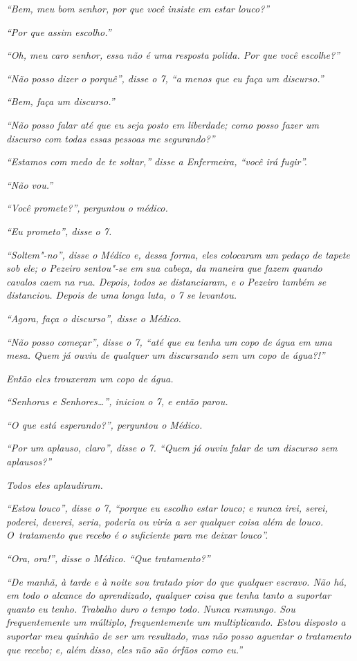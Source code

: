 \emph{``Bem, meu bom senhor, por que você insiste em estar louco?''}

\emph{``Por que assim escolho.''}

\emph{``Oh, meu caro senhor, essa não é uma resposta polida. Por que
você escolhe?''}

\emph{``Não posso dizer o porquê'', disse o 7, ``a menos que eu faça um
discurso.''}

\emph{``Bem, faça um discurso.''}

\emph{``Não posso falar até que eu seja posto em liberdade; como posso
fazer um discurso com todas essas pessoas me segurando?''}

\emph{``Estamos com medo de te soltar,'' disse a Enfermeira, ``você irá
fugir''.}

\emph{``Não vou.''}

\emph{``Você promete?'', perguntou o médico.}

\emph{``Eu prometo'', disse o 7.}

\emph{``Soltem"-no'', disse o Médico e, dessa forma, eles colocaram um
pedaço de tapete sob ele; o Pezeiro sentou"-se em sua cabeça, da maneira
que fazem quando cavalos caem na rua. Depois, todos se distanciaram, e o
Pezeiro também se distanciou. Depois de uma longa luta, o 7 se
levantou.}

\emph{``Agora, faça o discurso'', disse o Médico.}

\emph{``Não posso começar'', disse o 7, ``até que eu tenha um copo de
água em uma mesa. Quem já ouviu de qualquer um discursando sem um copo
de água?!''}

\emph{Então eles trouxeram um copo de água.}

\emph{``Senhoras e Senhores…'', iniciou o 7, e então parou.}

\emph{``O que está esperando?'', perguntou o Médico.}

\emph{``Por um aplauso, claro'', disse o 7. ``Quem já ouviu falar de um
discurso sem aplausos?''}

\emph{Todos eles aplaudiram.}

\emph{``Estou louco'', disse o 7, ``porque eu escolho estar louco; e
nunca irei, serei, poderei, deverei, seria, poderia ou viria a ser
qualquer coisa além de louco. O~tratamento que recebo é o suficiente
para me deixar louco''.}

\emph{``Ora, ora!'', disse o Médico. ``Que tratamento?''}

\emph{``De manhã, à tarde e à noite sou tratado pior do que qualquer
escravo. Não há, em todo o alcance do aprendizado, qualquer coisa que
tenha tanto a suportar quanto eu tenho. Trabalho duro o tempo todo.
Nunca resmungo. Sou frequentemente um múltiplo, frequentemente um
multiplicando. Estou disposto a suportar meu quinhão de ser um
resultado, mas não posso aguentar o tratamento que recebo; e, além
disso, eles não são órfãos como eu.''}

